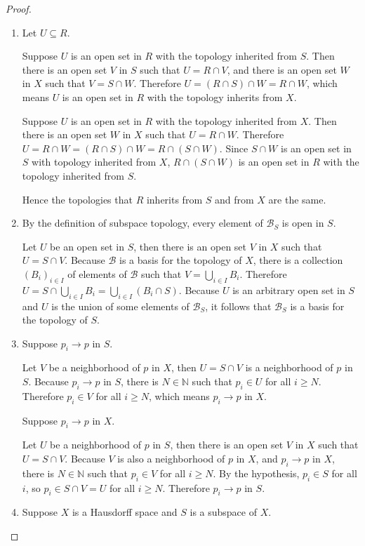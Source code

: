 \begin{proof}
	\begin{enumerate}[label={(\alph*)}]
		\item Let $U\subseteq R$.

		      Suppose $U$ is an open set in $R$ with the topology inherited from $S$. Then there is an open set $V$ in $S$ such that $U = R\cap V$, and there is an open set $W$ in $X$ such that $V = S\cap W$. Therefore $U = (R\cap S)\cap W = R\cap W$, which means $U$ is an open set in $R$ with the topology inherits from $X$.

		      Suppose $U$ is an open set in $R$ with the topology inherited from $X$. Then there is an open set $W$ in $X$ such that $U = R\cap W$. Therefore $U = R\cap W = (R\cap S)\cap W = R\cap (S\cap W)$. Since $S\cap W$ is an open set in $S$ with topology inherited from $X$, $R\cap (S\cap W)$ is an open set in $R$ with the topology inherited from $S$.

		      Hence the topologies that $R$ inherits from $S$ and from $X$ are the same.
		\item By the definition of subspace topology, every element of $\mathscr{B}_{S}$ is open in $S$.

		      Let $U$ be an open set in $S$, then there is an open set $V$ in $X$ such that $U = S\cap V$. Because $\mathscr{B}$ is a basis for the topology of $X$, there is a collection ${(B_{i})}_{i\in I}$ of elements of $\mathscr{B}$ such that $V = \bigcup_{i\in I}B_{i}$. Therefore $U = S\cap \bigcup_{i\in I}B_{i} = \bigcup_{i\in I}(B_{i}\cap S)$. Because $U$ is an arbitrary open set in $S$ and $U$ is the union of some elements of $\mathscr{B}_{S}$, it follows that $\mathscr{B}_{S}$ is a basis for the topology of $S$.
		\item Suppose $p_{i}\to p$ in $S$.

		      Let $V$ be a neighborhood of $p$ in $X$, then $U = S\cap V$ is a neighborhood of $p$ in $S$. Because $p_{i}\to p$ in $S$, there is $N\in\mathbb{N}$ such that $p_{i}\in U$ for all $i\geq N$. Therefore $p_{i}\in V$ for all $i\geq N$, which means $p_{i}\to p$ in $X$.

		      Suppose $p_{i}\to p$ in $X$.

		      Let $U$ be a neighborhood of $p$ in $S$, then there is an open set $V$ in $X$ such that $U = S\cap V$. Because $V$ is also a neighborhood of $p$ in $X$, and $p_{i}\to p$ in $X$, there is $N\in\mathbb{N}$ such that $p_{i}\in V$ for all $i\geq N$. By the hypothesis, $p_{i}\in S$ for all $i$, so $p_{i}\in S\cap V = U$ for all $i\geq N$. Therefore $p_{i}\to p$ in $S$.
		\item Suppose $X$ is a Hausdorff space and $S$ is a subspace of $X$.


\end{enumerate}
\end{proof}
